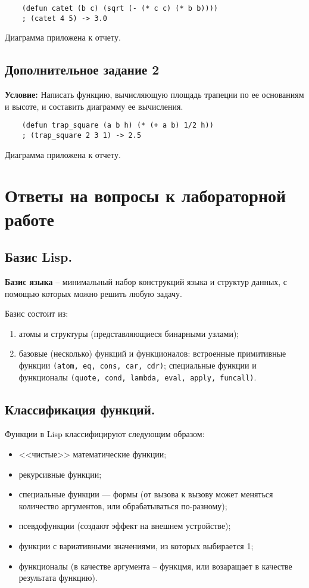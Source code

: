 \begin{lstlisting}
	(defun catet (b c) (sqrt (- (* c c) (* b b))))
	; (catet 4 5) -> 3.0
\end{lstlisting}

Диаграмма приложена к отчету.


\section{Дополнительное задание 2}

\textbf{Условие:} Написать функцию, вычисляющую площадь трапеции по ее основаниям и высоте, и составить диаграмму ее вычисления.

\begin{lstlisting}
	(defun trap_square (a b h) (* (+ a b) 1/2 h))
	; (trap_square 2 3 1) -> 2.5
\end{lstlisting}

Диаграмма приложена к отчету.




\chapter{Ответы на вопросы к лабораторной работе}

\section{Базис Lisp.}

\textbf{Базис языка} -- минимальный набор конструкций языка и структур данных, с помощью которых можно решить любую задачу.

Базис состоит из:
\begin{enumerate}
    \item атомы и структуры (представляющиеся бинарными узлами);
    \item базовые (несколько) функций и функционалов: встроенные примитивные функции \texttt{(atom, eq, cons, car, cdr)}; специальные функции и функционалы \texttt{(quote, cond, lambda, eval, apply, funcall)}.
\end{enumerate}


\section{Классификация функций.}

Функции в Lisp классифицируют следующим образом:

\begin{itemize}
    \item <<чистые>> математические функции;
    \item рекурсивные функции;
    \item специальные функции --- формы (от вызова к вызову может меняться количество аргументов, или обрабатываться по-разному);
    \item псевдофункции (создают эффект на внешнем устройстве);
    \item функции с вариативными значениями, из которых выбирается 1;
    \item функционалы (в качестве аргумента -- функцмя, или возаращает в качестве результата функцию).
\end{itemize}

